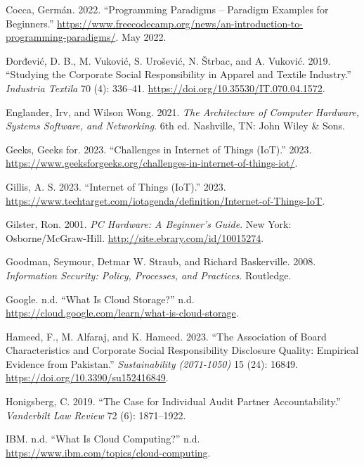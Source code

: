 \documentclass[
  letterpaper,
  DIV=11,
  numbers=noendperiod]{scrreprt}
\newlength{\cslhangindent}
\newenvironment{CSLReferences}[2] %
 {\begin{list}{}{%
  \setlength{\itemindent}{0pt}
  \setlength{\leftmargin}{0pt}
  \setlength{\parsep}{0pt}
  \ifodd #1
   \setlength{\leftmargin}{\cslhangindent}
   \setlength{\itemindent}{-1\cslhangindent}
  \fi
  \setlength{\itemsep}{#2\baselineskip}}}
 {\end{list}}
\begin{document}
\begin{CSLReferences}{1}{0}
Cocca, Germán. 2022. {``Programming Paradigms -- Paradigm Examples for
Beginners.''}
\url{https://www.freecodecamp.org/news/an-introduction-to-programming-paradigms/}.
May 2022.

Đorđević, D. B., M. Vuković, S. Urošević, N. Štrbac, and A. Vuković.
2019. {``Studying the Corporate Social Responsibility in Apparel and
Textile Industry.''} \emph{Industria Textila} 70 (4): 336--41.
\url{https://doi.org/10.35530/IT.070.04.1572}.

Englander, Irv, and Wilson Wong. 2021. \emph{The Architecture of
Computer Hardware, Systems Software, and Networking}. 6th ed. Nashville,
TN: John Wiley \& Sons.

Geeks, Geeks for. 2023. {``Challenges in Internet of Things (IoT).''}
2023.
\url{https://www.geeksforgeeks.org/challenges-in-internet-of-things-iot/}.

Gillis, A. S. 2023. {``Internet of Things (IoT).''} 2023.
\url{https://www.techtarget.com/iotagenda/definition/Internet-of-Things-IoT}.

Gilster, Ron. 2001. \emph{{PC} Hardware: A Beginner's Guide}. New York:
Osborne/{McGraw}-Hill. \url{http://site.ebrary.com/id/10015274}.

Goodman, Seymour, Detmar W. Straub, and Richard Baskerville. 2008.
\emph{Information Security: Policy, Processes, and Practices}.
Routledge.

Google. n.d. {``What Is Cloud Storage?''} n.d.
\url{https://cloud.google.com/learn/what-is-cloud-storage}.

Hameed, F., M. Alfaraj, and K. Hameed. 2023. {``The Association of Board
Characteristics and Corporate Social Responsibility Disclosure Quality:
Empirical Evidence from Pakistan.''} \emph{Sustainability (2071-1050)}
15 (24): 16849. \url{https://doi.org/10.3390/su152416849}.

Honigsberg, C. 2019. {``The Case for Individual Audit Partner
Accountability.''} \emph{Vanderbilt Law Review} 72 (6): 1871--1922.

IBM. n.d. {``What Is Cloud Computing?''} n.d.
\url{https://www.ibm.com/topics/cloud-computing}.


\end{CSLReferences}
\end{document}
